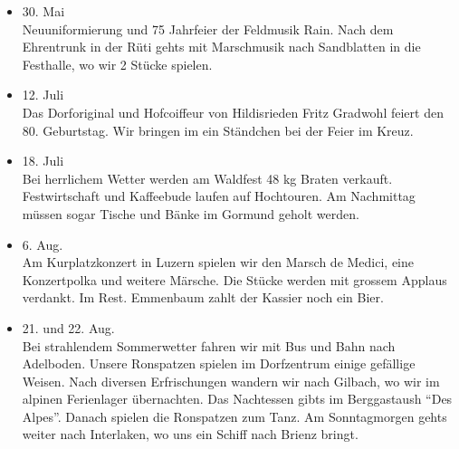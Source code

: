 \begin{multicols}{2}
\begin{itemize}
        \item[]30. Mai\\
        Neuuniformierung und 75 Jahrfeier der Feldmusik Rain. Nach dem
        Ehrentrunk in der Rüti gehts mit Marschmusik nach Sandblatten in die
        Festhalle, wo wir 2 Stücke spielen.

        \item[]12. Juli\\
        Das Dorforiginal und Hofcoiffeur von Hildisrieden Fritz Gradwohl feiert
        den 80. Geburtstag. Wir bringen im ein Ständchen bei der Feier im Kreuz.

        \item[]18. Juli\\
        Bei herrlichem Wetter werden am Waldfest 48 kg Braten verkauft.
        Festwirtschaft und Kaffeebude laufen auf Hochtouren. Am Nachmittag
        müssen sogar Tische und Bänke im Gormund geholt werden.

        \item[]6. Aug.\\
        Am Kurplatzkonzert in Luzern spielen wir den Marsch de Medici, eine
        Konzertpolka und weitere Märsche. Die Stücke werden mit grossem Applaus
        verdankt. Im Rest. Emmenbaum zahlt der Kassier noch ein Bier.

        \item[]21. und 22. Aug.\\
        Bei strahlendem Sommerwetter fahren wir mit Bus und Bahn nach Adelboden.
        Unsere Ronspatzen spielen im Dorfzentrum einige gefällige Weisen. Nach
        diversen Erfrischungen wandern wir nach Gilbach, wo wir im alpinen
        Ferienlager übernachten. Das Nachtessen gibts im Berggastaush \enquote{Des
            Alpes}. Danach spielen die Ronspatzen zum Tanz. Am Sonntagmorgen gehts
        weiter nach Interlaken, wo uns ein Schiff nach Brienz bringt.


    \end{itemize}

\end{multicols}

